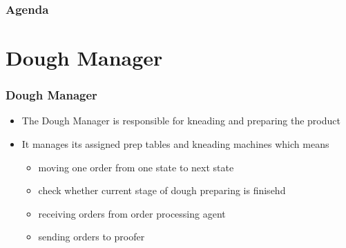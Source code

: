 \documentclass[hyperref={pdfpagelabels=false}]{beamer}
\author{Team PJT}
\title{\tit}
\begin{document}

    \begin{frame}
        \titlepage
    \end{frame}

    \begin{frame}
        \frametitle{Agenda}
        \hypertarget{tableofcontent}{}
        \tableofcontents
    \end{frame}

    \section{Dough Manager}
    \begin{frame}
        \frametitle{Dough Manager}
        \begin{itemize}
            \item The Dough Manager is responsible for kneading and preparing the product
            \item It manages its assigned prep tables and kneading machines which means
            \begin{itemize}
                \item moving one order from one state to next state
                \item check whether current stage of dough preparing is finisehd
                \item receiving orders from order processing agent
                \item sending orders to proofer
            \end{itemize}
        \end{itemize}
    \end{frame}


\end{document}
